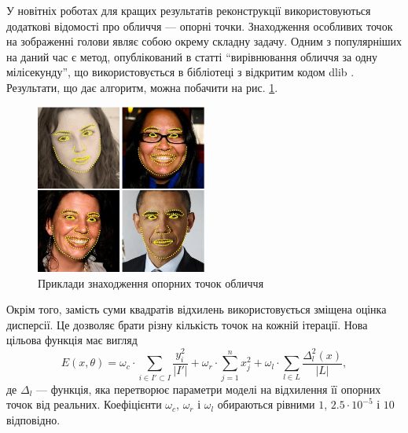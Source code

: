У новітніх роботах для кращих результатів реконструкції використовуються
додаткові відомості про обличчя --- опорні точки.
Знаходження особливих точок на зображенні голови
являє собою окрему складну задачу.
Одним з популярніших на даний час є метод, опублікований в статті
``вирівнювання обличчя за одну мілісекунду'',
що використовується в бібліотеці з відкритим кодом dlib \cite{Kazemi:2014}.
Результати, що дає алгоритм, можна побачити на рис. \ref{fig:problems:dlib}.
\begin{figure}[h]
  \centering
    \includegraphics[width=0.5\textwidth]{images/dlib}
  \caption{Приклади знаходження опорних точок обличчя}
  \label{fig:problems:dlib}
\end{figure}

Окрім того,
замість суми квадратів відхилень використовується зміщена оцінка дисперсії.
Це дозволяє брати різну кількість точок на кожній ітерації.
Нова цільова функція має вигляд
\begin{equation}\label{eq:energy:face2face}
  E\left( x, \theta \right)
  = \omega_c \cdot \sum_{i \in I' \subset I} \frac{y_i^2}{\left| I' \right|}
  + \omega_r \cdot \sum_{j = 1}^{n} x_j^2
  + \omega_l \cdot \sum_{l \in L} \frac{\Delta_l^2\left( x \right)}
                                       {\left| L \right|},
\end{equation}
де $\Delta_l$ --- функція,
яка перетворює параметри моделі на відхилення її опорних точок від реальних.
Коефіцієнти $\omega_c$, $\omega_r$ і $\omega_l$
обираються рівними $1$, $2.5 \cdot 10^{-5}$ і $10$ відповідно.
